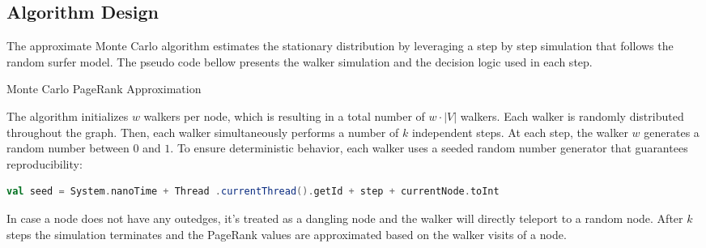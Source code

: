 \subsection{Algorithm Design}

The approximate Monte Carlo algorithm estimates the stationary distribution by leveraging a step by step simulation that follows the random surfer model.
The pseudo code bellow presents the walker simulation and the decision logic used in each step.

\vspace{2.0em}
\begin{algorithm}[H]
\caption{Monte Carlo PageRank Approximation}

\end{algorithm}
\vspace{2.0em}

The algorithm initializes $w$ walkers per node, which is resulting in a total number of $w\cdot |V|$ walkers. Each walker is randomly distributed throughout the graph. Then, each walker simultaneously performs a number of $k$ independent steps.
At each step, the walker $w$ generates a random number between $0$ and $1$. To ensure deterministic behavior, each walker uses a seeded random number generator that guarantees reproducibility:

\vspace{0.5em}
\begin{lstlisting}[language=Scala, caption={Random Seed}, label={lst:randseed}]
val seed = System.nanoTime + Thread .currentThread().getId + step + currentNode.toInt
\end{lstlisting}
\vspace{0.5em}

In case a node does not have any outedges, it's treated as a dangling node and the walker will directly teleport to a random node.
After $k$ steps the simulation terminates and the PageRank values are approximated based on the walker visits of a node.

